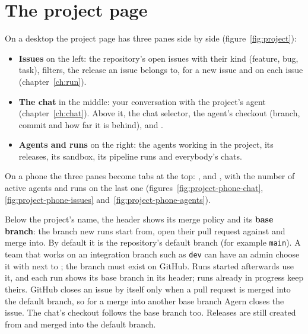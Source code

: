 
\section{The project page}\label{sec:project-page}

On a desktop the project page has three panes side by side (figure~\ref{fig:project}):

\begin{itemize}
  \item \textbf{Issues} on the left: the repository's open issues with their kind
    (feature, bug, task), filters, the release an issue belongs to,  for a new issue and
     on each issue (chapter~\ref{ch:run}).
  \item \textbf{The chat} in the middle: your conversation with the project's agent
    (chapter~\ref{ch:chat}). Above it, the chat selector, the agent's checkout (branch, commit and
    how far it is behind),  and .
  \item \textbf{Agents and runs} on the right: the agents working in the project, its releases,
    its sandbox, its pipeline runs and everybody's chats.
\end{itemize}


On a phone the three panes become tabs at the top: ,  and
, with the number of active agents and runs on the last one
(figures~\ref{fig:project-phone-chat}, \ref{fig:project-phone-issues} and~\ref{fig:project-phone-agents}).




Below the project's name, the header shows its merge policy and its \textbf{base branch}: the
branch new runs start from, open their pull request against and merge into. By default it is the
repository's default branch (for example \texttt{main}). A team that works on an integration branch
such as \texttt{dev} can have an admin choose it with  next to ; the
branch must exist on GitHub. Runs started afterwards use it, and each run shows its base branch in
its header; runs already in progress keep theirs. GitHub closes an issue by itself only when a pull
request is merged into the default branch, so for a merge into another base branch Agern closes the
issue. The chat's checkout follows the base branch too. Releases are still created from and merged
into the default branch.

